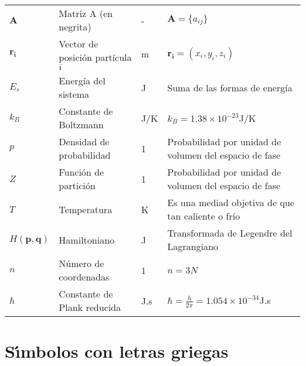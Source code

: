 \begin{longtable}{p{2cm}p{4cm}p{2cm}p{8cm}}
$\mathbf{A}$&Matriz A (en negrita)&\hspace{6pt}-&$\mathbf{A}=\{a_{ij}\}$\\%
$\mathbf{r_i}$&Vector de posici\'{o}n part\'{i}cula $i$&\hspace{6pt}m&$\mathbf{r_i}=\left(x_i,y_i,z_i\right)$\\%
$E_s$&Energ\'{i}a del sistema &\hspace{6pt}J  &Suma de las formas de energ\'{i}a\\%
$k_B$&Constante de Boltzmann &\hspace{6pt}J/K&$k_B=1.38\times 10^{-23}$J/K\\%
$p$&Densidad de probabilidad &\hspace{6pt}1 &Probabilidad por unidad de volumen del espacio de fase\\%
$Z$  &Funci\'{o}n de partici\'{o}n&\hspace{6pt}1 &Probabilidad por unidad de volumen del espacio de fase\\%
$T$ &Temperatura &\hspace{6pt}K &Es una mediad objetiva de que tan caliente o fr\'{i}o\\%
$H(\mathbf{p},\mathbf{q})$ &Hamiltoniano  &\hspace{6pt}J &Transformada de Legendre del Lagrangiano\\%
$n$ &N\'{u}mero de coordenadas    &\hspace{6pt}1 &$n=3N$\\%
$\hbar$&Constante de Plank reducida &\hspace{6pt}J.s &$\hbar=\frac{h}{2\pi}=1.054\times 10^{-34}$J.s\\%
\end{longtable}
\vspace{10ex}
\section*{S\'{\i}mbolos con letras griegas}


